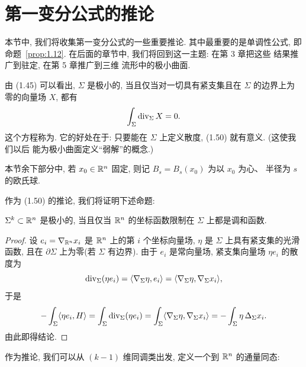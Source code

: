 \section{第一变分公式的推论}
\label{sec:1.3}

本节中, 我们将收集第一变分公式的一些重要推论. 其中最重要的是单调性公式, 即
命题~\ref{prop:1.12}. 在后面的章节中, 我们将回到这一主题: 在第 3 章把这些
结果推广到驻定, 在第 5 章推广到三维
流形中的极小曲面.

由 (1.45) 可以看出, $\Sigma$ 是极小的, 当且仅当对一切具有紧支集且在
$\Sigma$ 的边界上为零的向量场 $X$, 都有
\begin{equation}
\int_{\Sigma}\operatorname{div}_{\Sigma}X=0.
\label{eq:1.50}
\end{equation}
这个方程称为.
它的好处在于: 只要能在 $\Sigma$ 上定义散度, (1.50) 就有意义. (这使我们以后
能为极小曲面定义``弱解''的概念.)

本节余下部分中, 若 $x_0\in\mathbb{R}^n$ 固定, 则记 $B_s=B_s(x_0)$ 为以 $x_0$ 为心、
半径为 $s$ 的欧氏球.

作为 (1.50) 的推论, 我们将证明下述命题:

\begin{proposition}
\label{prop:1.7}
$\Sigma^k\subset\mathbb{R}^n$ 是极小的, 当且仅当 $\mathbb{R}^n$ 的坐标函数限制在 $\Sigma$
上都是调和函数.
\end{proposition}

\begin{proof}
设 $e_i=\nabla_{\mathbb{R}^n}x_i$ 是 $\mathbb{R}^n$ 上的第 $i$ 个坐标向量场, $\eta$ 是
$\Sigma$ 上具有紧支集的光滑函数, 且在 $\partial\Sigma$ 上为零(若 $\Sigma$
有边界). 由于 $e_i$ 是常向量场, 紧支集向量场 $\eta e_i$ 的散度为
\begin{equation}
\operatorname{div}_{\Sigma}(\eta e_i)=\langle\nabla_{\Sigma}\eta,e_i\rangle
 =\langle\nabla_{\Sigma}\eta,\nabla_{\Sigma}x_i\rangle,
\label{eq:1.51}
\end{equation}
于是
\begin{equation}
-\int_{\Sigma}\langle\eta e_i,H\rangle
 =\int_{\Sigma}\operatorname{div}_{\Sigma}(\eta e_i)
 =\int_{\Sigma}\langle\nabla_{\Sigma}\eta,\nabla_{\Sigma}x_i\rangle
 =-\int_{\Sigma}\eta\,\Delta_{\Sigma}x_i.
\label{eq:1.52}
\end{equation}
由此即得结论.
\end{proof}

作为推论, 我们可以从 $(k-1)$ 维同调类出发, 定义一个到 $\mathbb{R}^n$ 的通量同态:

